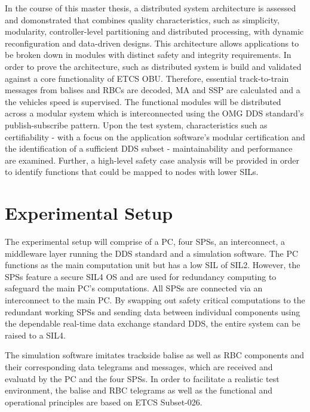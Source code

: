 \documentclass[a4paper, 12pt]{scrartcl}
\begin{document}
In the course of this master thesis, a distributed system architecture is assessed and domonstrated that combines quality characteristics, such as simplicity, modularity, controller-level partitioning and distributed processing, with dynamic reconfiguration and data-driven designs.
This architecture allows applications to be broken down in modules with distinct safety and integrity requirements.
In order to prove the architecture, such as distributed system is build and validated against a core functionality of \ac{ETCS OBU}.
Therefore, essential track-to-train messages from balises and \acp{RBC} are decoded, \ac{MA} and \ac{SSP} are calculated and a the vehicles speed is supervised.
The functional modules will be distributed across a modular system which is interconnected using the \ac{OMG} \ac{DDS} standard's publish-subscribe pattern.
Upon the test system, characteristics such as certifiability - with a focus on the application software's modular certification and the identification of a sufficient \ac{DDS} subset - maintainability and performance are examined.
Further, a high-level safety case analysis will be provided in order to identify functions that could be mapped to nodes with lower \acp{SIL}.

\section*{Experimental Setup}
The experimental setup will comprise of a PC, four \acp{SPS}, an interconnect, a middleware layer running the \ac{DDS} standard and a simulation software.
The PC functions as the main computation unit but has a low \ac{SIL} of \ac{SIL}2.
However, the \acp{SPS} feature a secure \ac{SIL}4 \ac{OS} and are used for redundancy computing to safeguard the main PC's computations.
All \acp{SPS} are connected via an interconnect to the main PC.
By swapping out safety critical computations to the redundant working \acp{SPS} and sending data between individual components using the dependable real-time data exchange standard \ac{DDS}, the entire system can be raised to a \ac{SIL}4.

The simulation software imitates trackside balise as well as \ac{RBC} components and their corresponding data telegrams and messages, which are received and evaluatd by the PC and the four \acp{SPS}.
In order to facilitate a realistic test environment, the balise and \ac{RBC} telegrams as well as the functional and operational principles are based on \ac{ETCS} Subset-026.
\end{document}

